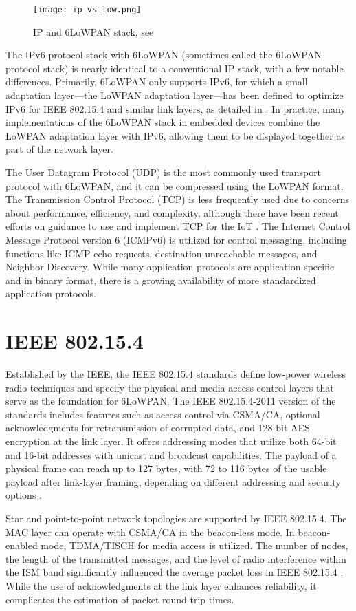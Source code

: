   \begin{figure}[h]
    \centering
    \texttt{[image: ip\_vs\_low.png]}
    \caption{IP and 6LoWPAN stack, see \cite[p.~16]{wie}}
    \label{fig:ip_vs_low}
  \end{figure}

  The IPv6 protocol stack with 6LoWPAN (sometimes called the 6LoWPAN protocol stack) is nearly 
  identical to a conventional IP stack, with a few notable differences. Primarily, 6LoWPAN only 
  supports IPv6, for which a small adaptation layer—the LoWPAN adaptation layer—has been defined 
  to optimize IPv6 for IEEE 802.15.4 and similar link layers, as detailed in \cite{rfc4944}. In practice, 
  many implementations of the 6LoWPAN stack in embedded devices combine the LoWPAN adaptation layer 
  with IPv6, allowing them to be displayed together as part of the network layer.

  The User Datagram Protocol (UDP) \cite{rfc768} is the most commonly used transport protocol 
  with 6LoWPAN, and it can be compressed using the LoWPAN format. The Transmission Control 
  Protocol (TCP) is less frequently used due to concerns about performance, efficiency, and 
  complexity, although there have been recent efforts on guidance to use and implement TCP for the IoT \cite{rfc9006}. 
  The Internet Control Message Protocol version 6 (ICMPv6) \cite{rfc4443} is utilized 
  for control messaging, including functions like ICMP echo requests, destination unreachable messages, 
  and Neighbor Discovery. While many application protocols are application-specific and in binary format, 
  there is a growing availability of more standardized application protocols.

\section{IEEE 802.15.4}
  Established by the IEEE, the IEEE 802.15.4 standards define low-power wireless radio techniques 
  and specify the physical and media access control layers that serve as the foundation for 6LoWPAN. 
  The IEEE 802.15.4-2011 version of the standards includes features such as access control via 
  CSMA/CA, optional acknowledgments for retransmission of corrupted data, and 128-bit AES encryption 
  at the link layer. It offers addressing modes that utilize both 64-bit and 16-bit addresses 
  with unicast and broadcast capabilities. The payload of a physical frame can reach up to 127 bytes, 
  with 72 to 116 bytes of the usable payload after link-layer framing, depending on different addressing 
  and security options \cite[Appendix B.1]{wie}.

  Star and point-to-point network topologies are supported by IEEE 802.15.4. The MAC layer can operate 
  with CSMA/CA in the beacon-less mode. In beacon-enabled mode, TDMA/TISCH for media access is utilized.
  The number of nodes, the length of the transmitted messages, and the level of radio interference 
  within the ISM band significantly influenced the average packet loss in IEEE 802.15.4 \cite{packet_loss}. 
  While the use of acknowledgments at the link layer enhances reliability, it complicates the 
  estimation of packet round-trip times.